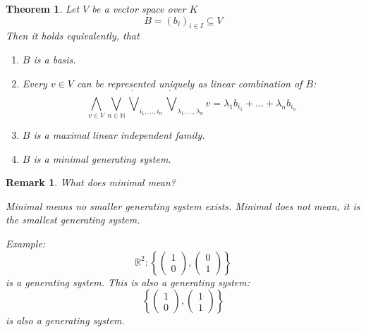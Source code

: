 \documentclass[a4paper,landscape,twocolumn]{article}
\newcommand\set[1]{\left\{#1\right\}}
\newtheorem{theorem}{Theorem}
\newtheorem{rem}{Remark}
\begin{document}
\begin{theorem}
  \label{thm:vector-space-statements}
  Let $V$ be a vector space over $K$
  \[ B = (b_i)_{i \in I} \subseteq V \]
  Then it holds equivalently, that
  \begin{enumerate}
    \item $B$ is a basis.
    \item Every $v \in V$ can be represented uniquely as linear combination of $B$:
      \[
        \bigwedge_{v \in V} \bigvee_{n \in \mathbb N}
        \dot\bigvee_{i_1, \ldots, i_n} \dot\bigvee_{\lambda_1, \ldots, \lambda_n} v
        = \lambda_1 b_{i_1} + \ldots + \lambda_n b_{i_n}
      \]
    \item $B$ is a maximal linear independent family.
    \item $B$ is a minimal generating system.
  \end{enumerate}
\end{theorem}

\begin{rem}
  What does \emph{minimal} mean?

  Minimal means no smaller generating system exists.
  Minimal does not mean, it is the smallest generating system.

  Example:
  \[ \mathbb R^2: \set{\begin{pmatrix} 1 \\ 0 \end{pmatrix}, \begin{pmatrix} 0 \\ 1 \end{pmatrix}} \]
  is a generating system. This is also a generating system:
  \[ \set{\begin{pmatrix} 1 \\ 0 \end{pmatrix}, \begin{pmatrix} 1 \\ 1 \end{pmatrix}} \]
  is also a generating system.
\end{rem}
\end{document}
